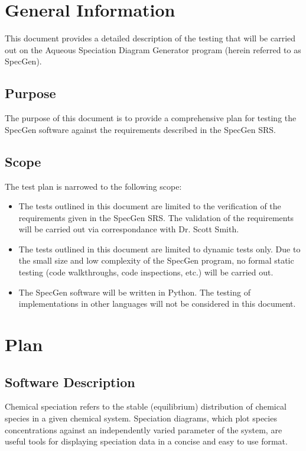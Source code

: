 \documentclass[12pt, titlepage]{article}
\newcommand{\progname}{SpecGen}
\begin{document}
\section{General Information}

This document provides a detailed description of the testing that will be 
carried out on the Aqueous Speciation Diagram Generator program (herein referred 
to as \progname{}).  

\subsection{Purpose}
The purpose of this document is to provide a comprehensive plan for testing the 
\progname{} software against the requirements described in the \progname{} SRS.

\subsection{Scope}
The test plan is narrowed to the following scope:
\begin{itemize}
\item The tests outlined in this document are limited to the verification of the 
  requirements given in the \progname{} SRS.  The validation of the requirements 
  will be carried out via correspondance with Dr. Scott Smith.
\item The tests outlined in this document are limited to dynamic tests only.  
  Due to the small size and low complexity of the \progname{} program, no formal
  static testing (code walkthroughs, code inspections, etc.) will be carried out.
\item The \progname{} software will be written in Python.  The testing of 
  implementations in other languages will not be considered in this document.
\end{itemize}

\section{Plan}
\label{SecPlan}
	
\subsection{Software Description}
Chemical speciation refers to the stable (equilibrium) distribution of chemical 
species in a given chemical system.   Speciation diagrams, which plot species 
concentrations against an independently varied parameter of the system, are 
useful tools for displaying speciation data in a concise and easy to use format.  
\end{document}
